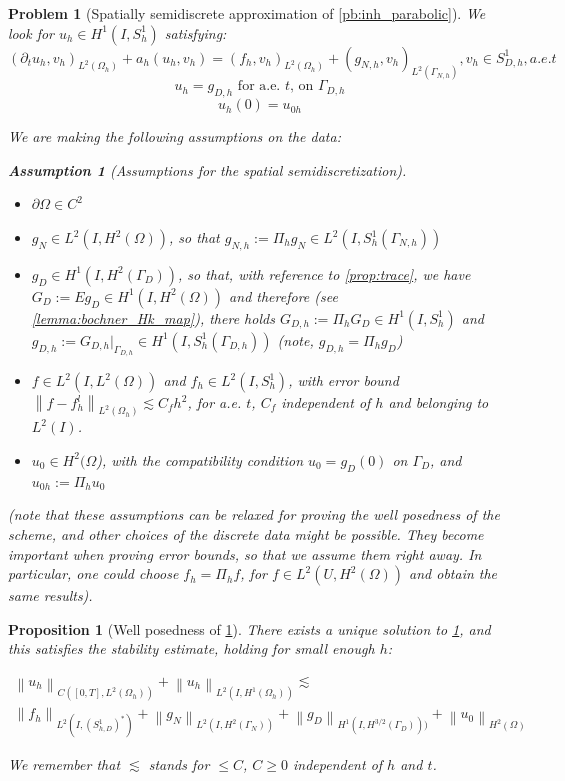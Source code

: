\documentclass[english,a4paper,10pt,oneside]{scrbook}	%
\theoremstyle{break}
\newtheorem{prop}[equation]{Proposition}
\newtheorem{ass}[equation]{Assumption}
\newtheorem{pb}[equation]{Problem}
\theoremstyle{remark}
\newcommand{\norm}[1]{\left\lVert#1\right\rVert}
\begin{document}
\begin{pb}[Spatially semidiscrete approximation of \cref{pb:inh_parabolic}]
\label{pb:inh_parabolic_discr}
We look for $u_h \in H^1(I, S^1_h)$ satisfying: 
$$(\partial_t u_h, v_h)_{L^2(\Omega_h)} + a_h(u_h, v_h) = (f_h, v_h)_{L^2(\Omega_h)} + (g_{N,h}, v_h)_{L^2(\Gamma_{N,h})}, v_h \in S^1_{D,h}, a.e. t$$
$$u_h=g_{D,h}\text{ for a.e. }t \text{,  on } \Gamma_{D,h}$$
$$u_h(0)=u_{0h}$$

We are making the following assumptions on the data:

\begin{ass}[Assumptions for the spatial semidiscretization]
\label{ass:discr_reg}
\textcolor{white}{ }
\begin{itemize}
	\item $\partial \Omega \in C^2$
	\item $g_N \in L^2(I,H^2(\Omega))$, so that $g_{N,h}:=\Pi_h g_N \in L^2(I, S^1_h(\Gamma_{N,h}))$
	\item $g_D \in H^1(I, H^{2}(\Gamma_D))$, so that, with reference to \cref{prop:trace}, we have $G_D:=Eg_D \in H^1(I,H^2(\Omega))$ and therefore (see \cref{lemma:bochner_Hk_map}), there holds	 $G_{D,h}:=\Pi_h G_D \in H^1(I, S^1_h)$ and $g_{D,h}:=G_{D,h}|_{\Gamma_{D,h}} \in H^1(I, S^1_h(\Gamma_{D,h}))$ (note, $g_{D,h} = \Pi_h g_D$)
	\item $f \in L^2(I,L^2(\Omega))$ and $f_h \in L^2(I, S^1_h)$, with error bound  $\norm{f-f_h^l}_{L^2(\Omega_h)}\lesssim C_f h^2$, for a.e. $t$, $C_f$ independent of $h$ and belonging to $L^2(I)$.
	\item $u_0\in H^2(\Omega$), with the compatibility condition $u_{0} = g_{D}(0)$ on $\Gamma_{D}$, and $u_{0h}:=\Pi_h u_0$
\end{itemize}

(note that these assumptions can be relaxed for proving the well posedness of the scheme, and other choices of the discrete data might be possible. They become important when proving error bounds, so that we assume them right away. In particular, one could choose $f_h=\Pi_h f$, for $f\in L^2(U, H^2(\Omega))$ and obtain the same results).

\end{ass}

\end{pb}

\begin{prop}[Well posedness of \cref{pb:inh_parabolic_discr}]
\label{prop:wp_discr_par}
There exists a unique solution to \cref{pb:inh_parabolic_discr}, and this satisfies the stability estimate, holding for small enough $h$:

\begin{align*}
	\norm{u_h}_{C([0,T],L^2(\Omega_h))} + \norm{u_h}_{L^2(I,H^1(\Omega_h))}\lesssim \\\norm{f_h}_{L^2(I,(S^1_{h,D})^*)}  + \norm{g_{N}}_{L^2(I,H^2(\Gamma_{N}))} + \norm{g_D}_{H^1(I,H^{3/2}(\Gamma_D)))} + \norm{u_{0}}_{H^2(\Omega)}
\end{align*}

We remember that $\lesssim$ stands for $\leq C$, $C\geq 0$ independent of $h$ and $t$.

\end{prop}
\end{document}
